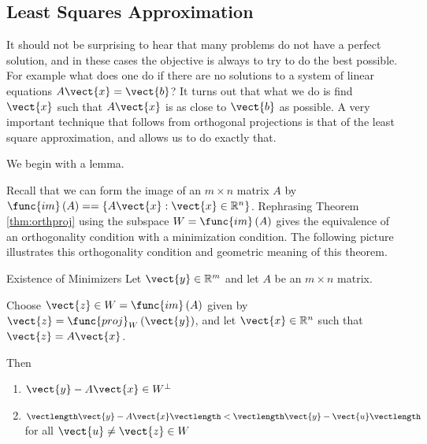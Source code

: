 \subsection{Least Squares Approximation}

It should not be surprising to hear that many problems do not have a
perfect solution, and in these cases the objective is always to try to
do the best possible. For example what does one do if there are no
solutions to a system of linear equations $A\vect{x}=\vect{b}$? It
turns out that what we do is find $\vect{x}$ such that $A\vect{x}$ is
as close to $\vect{b}$ as possible. A very important technique that
follows from orthogonal projections is that of the least square
 approximation, and allows us to do
exactly that.

We begin with a lemma. 

Recall that we can form the image of an $m \times n$ matrix $A$ by
$\func{im}\left( A\right) = = \left\{ A\vect{x} : \vect{x} \in
\mathbb{R}^n \right\}$. Rephrasing Theorem \ref{thm:orthproj} using
the subspace $W=\func{im}\left( A\right)$  gives the
equivalence of an orthogonality condition with a minimization
condition. The following picture
illustrates this orthogonality condition and geometric meaning of this
theorem.

\begin{center}
\end{center}

\begin{theorem}{Existence of Minimizers}\label{thm:existenceminimizerhs}\label{existenceminimizerhs}
Let $\vect{y}\in \mathbb{R}^{m}$ and let $A$ be an $m\times n$ matrix.

Choose $\vect{z}\in W= \func{im}\left( A\right)$ given by $\vect{z} =
\func{proj}_{W}\left( \vect{y}\right)$, and let $\vect{x} \in \mathbb{R}^{n}$ such that $\vect{z}=A\vect{x}$.

Then
\begin{enumerate}
\item $\vect{y} - A\vect{x} \in W^{\perp}$
\item $\vectlength \vect{y} - A\vect{x} \vectlength < \vectlength \vect{y} - \vect{u} \vectlength$ for all $\vect{u} \neq \vect{z} \in W$
\end{enumerate}
\end{theorem}

